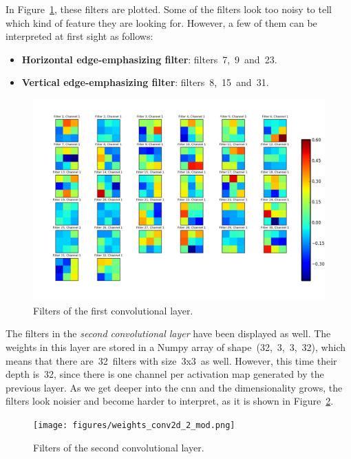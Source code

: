 In Figure~\ref{fig:filters}, these filters are plotted. Some of the filters look too noisy to tell which kind of feature they are looking for. However, a few of them can be interpreted at first sight as follows:
\begin{itemize}
	\item \textbf{Horizontal edge-emphasizing filter}: filters~7,~9~and~23.
	\item \textbf{Vertical edge-emphasizing filter}: filters~8,~15~and~31.	
\end{itemize}

\begin{figure}
	\centering
	\includegraphics[width=0.92\linewidth, keepaspectratio]{figures/weights_conv2d_1.png}
	\caption{Filters of the first convolutional layer.}
	\label{fig:filters}
\end{figure}

The filters in the \emph{second convolutional layer} have been displayed as well. The weights in this layer are stored in a Numpy array of shape~(32,~3,~3,~32), which means that there are~32~filters with size~3x3~as well. However, this time their depth is~32, since there is one channel per activation map generated by the previous layer. As we get deeper into the \gls{cnn} and the dimensionality grows, the filters look noisier and become harder to interpret, as it is shown in Figure~\ref{fig:filters2}.
\begin{figure}
	\centering
	\texttt{[image: figures/weights\_conv2d\_2\_mod.png]}
	\caption{Filters of the second convolutional layer.}
	\label{fig:filters2}
\end{figure}

